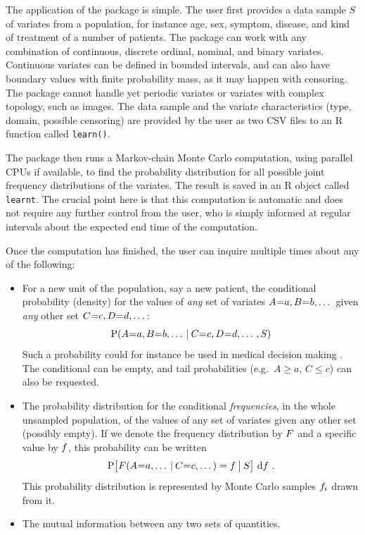 The application of the package is simple. The user first provides a data sample $S$ of variates from a population, for instance age, sex, symptom, disease, and kind of treatment of a number of patients. The package can work with any combination of continuous, discrete ordinal, nominal, and binary variates. Continuous variates can be defined in bounded intervals, and can also have boundary values with finite probability mass, as it may happen with censoring. The package cannot handle yet periodic variates or variates with complex topology, such as images. The data sample and the variate characteristics (type, domain, possible censoring) are provided by the user as two CSV files to an R function called \texttt{learn()}.

The package then runs a Markov-chain Monte Carlo computation, using parallel CPUs if available, to find the probability distribution for all possible joint frequency distributions of the variates. The result is saved in an R object called \texttt{learnt}. The crucial point here is that this computation is automatic and does not require any further control from the user, who is simply informed at regular intervals about the expected end time of the computation.

Once the computation has finished, the user can inquire multiple times about any of the following:
\setlength{\leftmargini}{17.62pt}
\begin{itemize}
  \itemsep0.5ex
\item For a new unit of the population, say a new patient, the conditional probability (density) for the values of \emph{any} set of variates $A \mo a, B \mo b, \dotso$ given \emph{any} other set $C \mo c, D \mo d, \dotso$:
  \begin{equation}\label{eq:prob_var}
    \P(A \mo a, B \mo b, \dotso \|C \mo c, D \mo d, \dotso , S)
  \end{equation}
  Such a probability could for instance be used in medical decision making \citep{soxetal1988_r2024,huninketal2001_r2014}. The conditional can be empty, and tail probabilities (e.g.\ $A \ge a$, $C \le c$) can also be requested.

\item The probability distribution for the conditional \emph{frequencies}, in the whole unsampled population, of the values of any set of variates given any other set (possibly empty). If we denote the frequency distribution by $F$ and a specific value by $f$, this probability can be written
  \begin{equation}\label{eq:prob_freq}
    \P\bigl[ \yF(A \mo a, \dotso \|C \mo c, \dotso) = \yf \|[\big] S\bigr]
    \,\di\yf \ .
  \end{equation}
This probability distribution is represented by Monte Carlo samples $f_{i}$ drawn from it.

\item The mutual information \citep[Ch.~8]{mackay1995_r2005} between any two sets of quantities.
\end{itemize}
\vspace{-\topsep}

